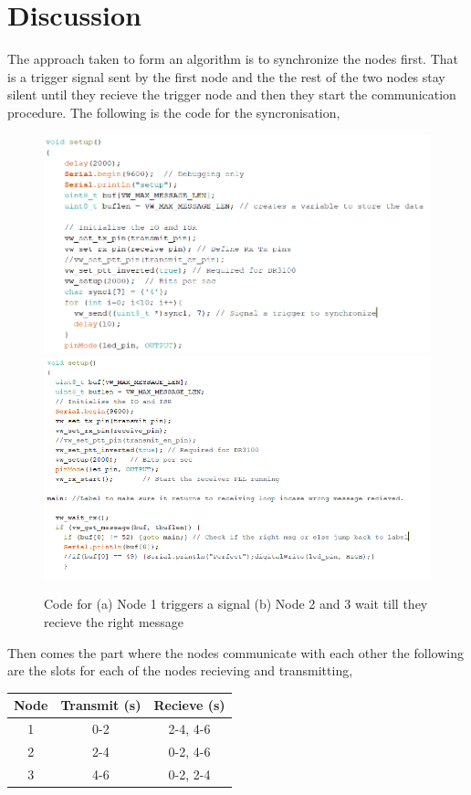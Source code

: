 \documentclass[12pt]{article}
\begin{document}
 \section{Discussion}
 
The approach taken to form an algorithm is to synchronize the nodes first. That is a trigger signal sent by the first node and the the rest of the two nodes stay silent until they recieve the trigger node and then they start the communication procedure. The following is the code for the syncronisation,

\begin{figure}[h]
\centering
\includegraphics[scale=0.5]{sync1.PNG}
\includegraphics[scale=0.5]{sync2.PNG}
\caption{Code for (a) Node 1 triggers a signal (b) Node 2 and 3 wait till they recieve the right message}
\end{figure}


 Then comes the part where the nodes communicate with each other the following are the slots for each of the nodes recieving and transmitting,
 
\begin{center}
\begin{tabular}{ |c|c|c| } 
 \hline
 Node & Transmit (s) & Recieve (s) \\ 
 \hline
 \hline
 1 & 0-2 & 2-4, 4-6 \\ 
 2 & 2-4 & 0-2, 4-6 \\ 
 3 & 4-6 & 0-2, 2-4 \\ 
 \hline
\end{tabular}
\end{center}
\end{document}
